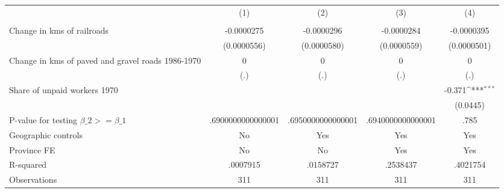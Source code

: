 {
\def\sym#1{\ifmmode^{#1}\else\(^{#1}\)\fi}
\begin{tabular}{l*{4}{c}}
\hline\hline
                &\multicolumn{1}{c}{(1)}&\multicolumn{1}{c}{(2)}&\multicolumn{1}{c}{(3)}&\multicolumn{1}{c}{(4)}\\
                &\multicolumn{1}{c}{}&\multicolumn{1}{c}{}&\multicolumn{1}{c}{}&\multicolumn{1}{c}{}\\
\hline
Change in kms of railroads&-0.0000275         &-0.0000296         &-0.0000284         &-0.0000395         \\
                &(0.0000556)         &(0.0000580)         &(0.0000559)         &(0.0000501)         \\
[1em]
Change in kms of paved and gravel roads 1986-1970&        0         &        0         &        0         &        0         \\
                &      (.)         &      (.)         &      (.)         &      (.)         \\
[1em]
Share of unpaid workers 1970&                  &                  &                  &   -0.371\sym{***}\\
                &                  &                  &                  & (0.0445)         \\
\hline
P-value for testing $\beta\_{2} >= \beta\_{1}$&.6900000000000001         &.6950000000000001         &.6940000000000001         &     .785         \\
Geographic controls&       No         &      Yes         &      Yes         &      Yes         \\
Province FE     &       No         &       No         &      Yes         &      Yes         \\
R-squared       & .0007915         & .0158727         & .2538437         & .4021754         \\
Observations    &      311         &      311         &      311         &      311         \\
\hline\hline
\end{tabular}
}
